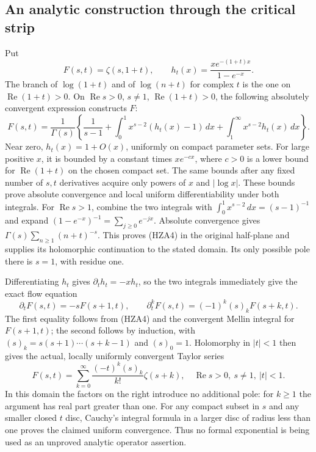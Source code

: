 \subsection{An analytic construction through the critical strip}

Put
\begin{equation}\tag{HZA3}
 F(s,t)=\zeta(s,1+t),\qquad
 h_t(x)=\frac{x e^{-(1+t)x}}{1-e^{-x}}.
\end{equation}
The branch of $\log(1+t)$ and of $\log(n+t)$ for complex $t$ is the
one on $\operatorname{Re}(1+t)>0$. On
$\operatorname{Re}s>0$, $s\ne1$, $\operatorname{Re}(1+t)>0$, the
following absolutely convergent expression constructs $F$:
\begin{equation}\tag{HZA4}
 F(s,t)=\frac1{\Gamma(s)}\left\{
 \frac1{s-1}+
 \int_0^1 x^{s-2}(h_t(x)-1)\,dx+
 \int_1^\infty x^{s-2}h_t(x)\,dx\right\}.
\end{equation}
Near zero, $h_t(x)=1+O(x)$, uniformly on compact parameter sets.
For large positive $x$, it is bounded by a constant times
$x e^{-c x}$, where $c>0$ is a lower bound for
$\operatorname{Re}(1+t)$ on the chosen compact set. The same bounds
after any fixed number of $s,t$ derivatives acquire only powers of
$x$ and $|\log x|$. These bounds prove absolute convergence and local
uniform differentiability under both integrals. For
$\operatorname{Re}s>1$, combine the two integrals with
$\int_0^1x^{s-2}\,dx=(s-1)^{-1}$ and expand
$(1-e^{-x})^{-1}=\sum_{j\ge0}e^{-jx}$. Absolute convergence gives
$\Gamma(s)\sum_{n\ge1}(n+t)^{-s}$. This proves (HZA4) in the original
half-plane and supplies its holomorphic continuation to the stated
domain. Its only possible pole there is $s=1$, with residue one.

Differentiating $h_t$ gives $\partial_t h_t=-x h_t$, so the two
integrals immediately give the exact flow equation
\begin{equation}\tag{HZA5}
 \partial_t F(s,t)=-s F(s+1,t),\qquad
 \partial_t^kF(s,t)=(-1)^k(s)_kF(s+k,t).
\end{equation}
The first equality follows from (HZA4) and the convergent Mellin
integral for $F(s+1,t)$; the second follows by induction, with
$(s)_k=s(s+1)\cdots(s+k-1)$ and $(s)_0=1$. Holomorphy in $|t|<1$
then gives the actual, locally uniformly convergent Taylor series
\begin{equation}\tag{HZA6}
 F(s,t)=\sum_{k=0}^{\infty}
       \frac{(-t)^k(s)_k}{k!}\zeta(s+k),\quad
       \operatorname{Re}s>0,\ s\ne1,\ |t|<1.
\end{equation}
In this domain the factors on the right introduce no additional pole:
for $k\ge1$ the argument has real part greater than one.
For any compact subset in $s$ and any smaller closed $t$ disc,
Cauchy's integral formula in a larger disc of radius less than one
proves the claimed uniform convergence. Thus no formal exponential
is being used as an unproved analytic operator assertion.

